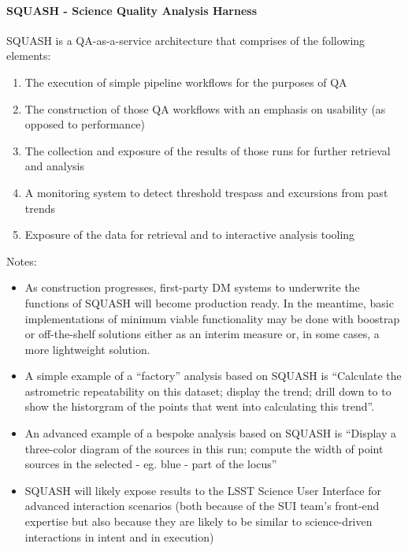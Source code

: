 \paragraph{SQUASH - Science Quality Analysis Harness}
\label{sec:qaSquash}

SQUASH is a QA-as-a-service architecture that comprises of the
following elements:

\begin{enumerate}
\item The execution of simple pipeline workflows for the purposes of QA

\item The construction of those QA workflows with an emphasis on usability (as opposed to performance)

\item The collection and exposure of the results of those runs for further retrieval and analysis

\item A monitoring system to detect threshold trespass and excursions from past trends

\item Exposure of the data for retrieval and to interactive analysis tooling

\end{enumerate}


Notes:

\begin{itemize}

\item As construction progresses, first-party DM systems to underwrite the functions of SQUASH will become production ready. In the meantime, basic implementations of minimum viable functionality may be done with boostrap or off-the-shelf solutions either as an interim measure or, in some cases, a more lightweight solution.

\item A simple example of a ``factory'' analysis based on SQUASH is ``Calculate the astrometric repeatability on this dataset; display the trend; drill down to to show the historgram of the points that went into calculating this trend''.

\item An advanced example of a bespoke analysis based on SQUASH is “Display a three-color diagram of the sources in this run; compute the width of point sources in the selected - eg. blue - part of the locus''

\item SQUASH will likely expose results to the LSST Science User Interface for advanced interaction scenarios (both because of the SUI team's front-end expertise but also because they are likely to be similar to science-driven interactions in intent and in execution)

\end{itemize}

